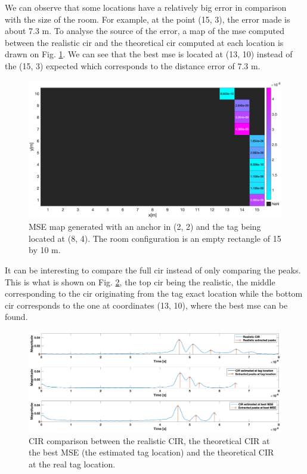 We can observe that some locations have a relatively big error in comparison with the size of the room. For example, at the point (15, 3), the error made is about 7.3 m. To analyse the source of the error, a map of the \gls{mse} computed between the realistic \gls{cir} and the theoretical \gls{cir} computed at each location is drawn on Fig. \ref{fig:mse_analysis}. We can see that the best \gls{mse} is located at (13, 10) instead of the (15, 3) expected which corresponds to the distance error of 7.3 m.

\begin{figure}[H]
\centering
\includegraphics[width=\linewidth]{Images/no_name_1.png}
\caption{MSE map generated with an anchor in (2, 2) and the tag being located at (8, 4). The room configuration is an empty rectangle of 15 by 10 m. \label{fig:mse_analysis}}
\end{figure}

It can be interesting to compare the full \gls{cir} instead of only comparing the peaks. This is what is shown on Fig. \ref{fig:cir_compa}, the top \gls{cir} being the realistic, the middle corresponding to the \gls{cir} originating from the tag exact location while the bottom \gls{cir} corresponds to the one at coordinates (13, 10), where the best \gls{mse} can be found.

\begin{figure}[H]
\centering
\includegraphics[width=\linewidth]{Images/no_name_2.png}
\caption{CIR comparison between the realistic CIR, the theoretical CIR at the best MSE (the estimated tag location) and the theoretical CIR at the real tag location. \label{fig:cir_compa}}
\end{figure}


